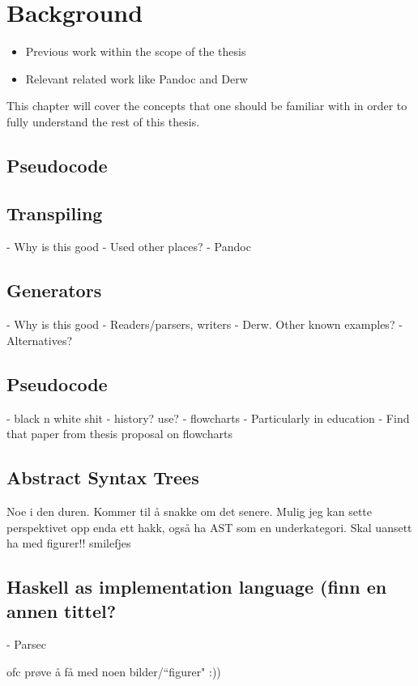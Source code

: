 \chapter{Background} %
\begin{itemize}
    \item Previous work within the scope of the thesis
    \item Relevant related work like Pandoc and Derw
\end{itemize}

This chapter will cover the concepts that one should be familiar with in order to fully understand the rest of this thesis.

\section{Pseudocode}

\section{Transpiling}

- Why is this good
- Used other places?
- Pandoc

\section{Generators}

- Why is this good
- Readers/parsers, writers
- Derw. Other known examples?
- Alternatives?

\section{Pseudocode}

- black n white shit
- history? use?
- flowcharts
- Particularly in education
- Find that paper from thesis proposal on flowcharts

\section{Abstract Syntax Trees}

Noe i den duren. Kommer til å snakke om det senere. Mulig jeg kan sette perspektivet opp enda ett hakk, også ha AST som en underkategori. Skal uansett ha med figurer!! smilefjes

\section{Haskell as implementation language (finn en annen tittel?}

- Parsec

ofc prøve å få med noen bilder/“figurer" :))


